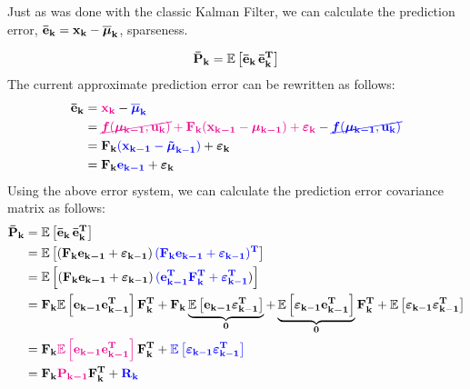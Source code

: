\documentclass[12pt]{article}
\begin{document}
Just as was done with the classic Kalman Filter, we can calculate the prediction
 error, $\boldsymbol{\mathbf{\bar{e}_k}} = \boldsymbol{\mathbf{x_k}} - \boldsymbol{\mathbf{\overline{\mu}_k}}$, sparseness.

\begin{equation}
\boldsymbol{\mathbf{\bar{P}_k}} = \mathbb{E}\left[\boldsymbol{\mathbf{\bar{e}_k}}\, \boldsymbol{\mathbf{\bar{e}_k^T}}\right]    
\end{equation}
The current approximate prediction error can be rewritten as follows:
\begin{equation}
    \begin{aligned}
        \boldsymbol{\mathbf{\bar{e}_k}} &= \color{magenta}\boldsymbol{\mathbf{x_k}}\color{black} - \color{blue}\boldsymbol{\mathbf{\overline{\mu}_k}}\color{black}\\
        &= \color{magenta}\cancel{{\boldsymbol{f}}(\boldsymbol{\mathbf{\mu_{k-1}}}, \boldsymbol{\mathbf{u_k}})} + \boldsymbol{\mathbf{F_k}} 
        (\boldsymbol{\mathbf{x_{k-1}}} - \boldsymbol{\mathbf{\mu_{k-1}}}) + \boldsymbol{\mathbf{\varepsilon_k}}\color{black} - 
        \color{blue}\cancel{{\boldsymbol{f}}(\boldsymbol{\mathbf{\mu_{k-1}}}, \boldsymbol{\mathbf{u_k}})}\color{black}\\
        &= \boldsymbol{\mathbf{F_k}} \color{blue}(\boldsymbol{\mathbf{x_{k-1}}} - {\boldsymbol{\tilde\mu}}_\mathbf{k-1})\color{black} + {\boldsymbol{\varepsilon}}_\mathbf{k}\\
        &= \boldsymbol{\mathbf{F_k}}\color{blue}\boldsymbol{\mathbf{e_{k-1}}}\color{black} + {\boldsymbol{\varepsilon}}_\mathbf{k}
    \end{aligned}
\end{equation}
Using the above error system, we can calculate the prediction error covariance matrix as follows:
\begin{equation}
    \begin{aligned}
        \mat{\bar{P}_k} &= \expv{\bvec{\bar{e}_k}\, \bvecT{\bar{e}_k}}\\
        &= \expv{(\mat{F_k}\bvec{e_{k-1}} + \mb{\varepsilon}_\mathbf{k-1}) \, 
        \blue{(\mat{F_k}\bvec{e_{k-1}} + 
        \mb{\varepsilon}_\mathbf{k-1})^\mathbf{T}}}\\
        &= \expv{(\mat{F_k}\bvec{e_{k-1}} + \mb{\varepsilon}_\mathbf{k-1}) \, \blue{(\bvecT{e_{k-1}}\matT{F_k} + \mb{\varepsilon}_\mathbf{k-1}^\mathbf{T}})}\\
        &= \mat{F_k}\expv{\bvec{e_{k-1}} \bvecT{e_{k-1}}}\matT{F_k} + \mat{F_k} \underbrace{\expv{ \bvec{e_{k-1}} \mb{\varepsilon}_\mathbf{k-1}^\mathbf{T} }}_{\mat{0}} + \underbrace{\expv{\mb{\varepsilon}_\mathbf{k-1} \bvecT{e_{k-1}}}}_{\mat{0}} \matT{F_{k}} + \expv{\mb{\varepsilon}_\mathbf{k-1} \mb{\varepsilon}_\mathbf{k-1}^\mathbf{T}}\\
        &= \mat{F_k}\magenta{\expv{\bvec{e_{k-1}} \bvecT{e_{k-1}}}}\matT{F_k} + \blue{\expv{\mb{\varepsilon}_\mathbf{k-1} \mb{\varepsilon}_\mathbf{k-1}^\mathbf{T}}}\\
        &= \mat{F_k}\magenta{ \mat{P_{k-1}} } \matT{F_k} + \blue{\mat{R_k}}
    \end{aligned}
    \label{eq:ekf-prediction-error-covariance}
\end{equation}
\end{document}
